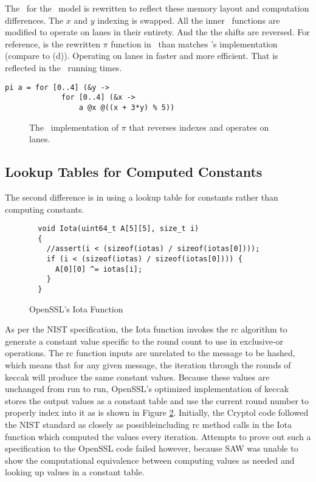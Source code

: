 The \cryptol\ for the \fips\ model is rewritten to reflect these memory layout and computation differences.
The $x$ and $y$ indexing is swapped.
All the inner \keccak\ functions are modified to operate on lanes in their entirety.
And the the shifts are reversed.
For reference,  is the rewritten $\pi$ function in \cryptol\ than matches \openssl's implementation (compare to (d)).
Operating on lanes in faster and more efficient.
That is reflected in the \cryptol\ running times.

\newsavebox{\PiOpenSSL}
\begin{lrbox}{\PiOpenSSL}
  \begin{lstlisting}[language=Cryptol]
    pi a = for [0..4] (&y ->
             for [0..4] (&x -> 
                 a @x @((x + 3*y) % 5))
  \end{lstlisting}
\end{lrbox}

\begin{figure}
  \begin{center}
    \usebox{\PiOpenSSL}
  \end{center}
  \caption{The \openssl\ implementation of $\pi$ that reverses indexes and operates on lanes.}
  \label{fig:piopenssl}
\end{figure}


\subsection{Lookup Tables for Computed Constants}

The second difference is in using a lookup table for constants rather than computing constants.

\lstset{style=customc, firstnumber=177}
\begin{figure}[t]
  \centering
\begin{lstlisting}
  void Iota(uint64_t A[5][5], size_t i)
  {
    //assert(i < (sizeof(iotas) / sizeof(iotas[0])));
    if (i < (sizeof(iotas) / sizeof(iotas[0]))) {
      A[0][0] ^= iotas[i];
    }
  }
\end{lstlisting}
\caption{OpenSSL's Iota Function}
\label{fig:cIota}
\end{figure}

As per the NIST specification, the Iota function invokes the rc algorithm to generate a constant value specific to the round count to use in exclusive-or operations.
The rc function inputs are unrelated to the message to be hashed, which means that for any given message, the iteration through the rounds of keccak will produce the same constant values.
Because these values are unchanged from run to run, OpenSSL's optimized implementation of keccak stores the output values as a constant table and use the current round number to properly index into it as is shown in Figure \ref{fig:cIota}. 
Initially, the Cryptol code followed the NIST standard as closely as possible\textemdash including rc method calls in the Iota function which computed the values every iteration.
Attempts to prove out such a specification to the OpenSSL code failed however, because SAW was unable to show the computational equivalence between computing values as needed and looking up values in a constant table.

